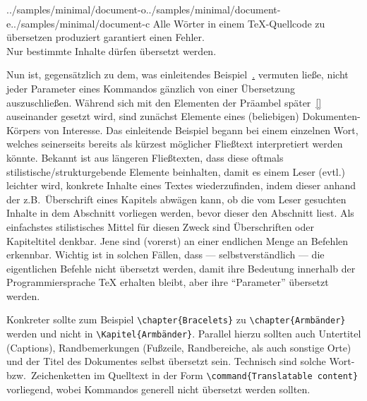 \begin{displaySourceCode}[Problem]{../samples/minimal/document-o}{../samples/minimal/document-e}{../samples/minimal/document-c}
    Alle Wörter in einem \TeX{}-Quellcode zu übersetzen produziert garantiert einen Fehler.\\
    Nur bestimmte Inhalte dürfen übersetzt werden.
\end{displaySourceCode}\label{exem:problems:paragraph}

Nun ist, gegensätzlich zu dem, was einleitendes Beispiel~\hyperref[exem:problems:paragraph]{\thesection.\thedisplaySourceCode} vermuten ließe, nicht jeder Parameter eines Kommandos gänzlich von einer Übersetzung auszuschließen. Während sich mit den Elementen der Präambel später~\ref{} auseinander gesetzt wird, sind zunächst Elemente eines (beliebigen) Dokumenten-Körpers von Interesse. Das einleitende Beispiel begann bei einem einzelnen Wort, welches seinerseits bereits als kürzest möglicher Fließtext interpretiert werden könnte. Bekannt ist aus längeren Fließtexten, dass diese oftmals stilistische/strukturgebende Elemente beinhalten, damit es einem Leser (evtl.) leichter wird, konkrete Inhalte eines Textes wiederzufinden, indem dieser anhand der z.B.\ Überschrift eines Kapitels abwägen kann, ob die vom Leser gesuchten Inhalte in dem Abschnitt vorliegen werden, bevor dieser den Abschnitt liest. Als einfachstes stilistisches Mittel für diesen Zweck sind Überschriften oder Kapiteltitel denkbar. Jene sind (vorerst) an einer endlichen Menge an Befehlen erkennbar. Wichtig ist in solchen Fällen, dass --- selbstverständlich --- die eigentlichen Befehle nicht übersetzt werden, damit ihre Bedeutung innerhalb der Programmiersprache \TeX{} erhalten bleibt, aber ihre \enquote{Parameter} übersetzt werden. 


Konkreter sollte zum Beispiel \verb|\chapter{Bracelets}| zu \verb|\chapter{Armbänder}| werden und nicht in \verb|\Kapitel{Armbänder}|.
Parallel hierzu sollten auch Untertitel (Captions), Randbemerkungen (Fußzeile, Randbereiche, als auch sonstige Orte) und der Titel des Dokumentes selbst übersetzt sein. Technisch sind solche Wort- bzw.\ Zeichenketten im Quelltext in der Form \verb|\command{Translatable content}| vorliegend, wobei Kommandos generell nicht übersetzt werden sollten.


